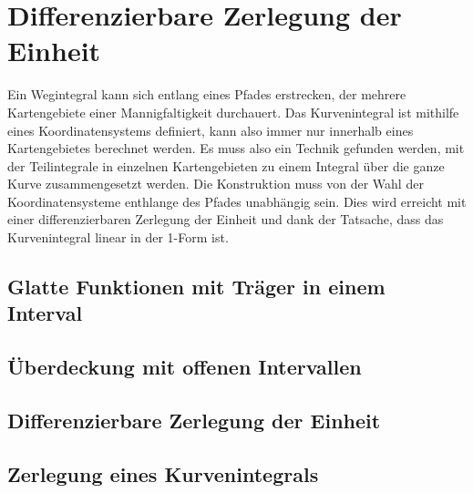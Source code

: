 %
%
\section{Differenzierbare Zerlegung der Einheit}
Ein Wegintegral kann sich entlang eines Pfades erstrecken, der
mehrere Kartengebiete einer Mannigfaltigkeit durchauert.
Das Kurvenintegral ist mithilfe eines Koordinatensystems definiert,
kann also immer nur innerhalb eines Kartengebietes berechnet werden.
Es muss also ein Technik gefunden werden, mit der Teilintegrale in
einzelnen Kartengebieten zu einem Integral über die ganze Kurve
zusammengesetzt werden.
Die Konstruktion muss von der Wahl der Koordinatensysteme enthlange
des Pfades unabhängig sein.
Dies wird erreicht mit einer differenzierbaren Zerlegung der Einheit
und dank der Tatsache, dass das Kurvenintegral linear in der 1-Form
ist.

\subsection{Glatte Funktionen mit Träger in einem Interval}

\subsection{Überdeckung mit offenen Intervallen}

\subsection{Differenzierbare Zerlegung der Einheit}

\subsection{Zerlegung eines Kurvenintegrals}


